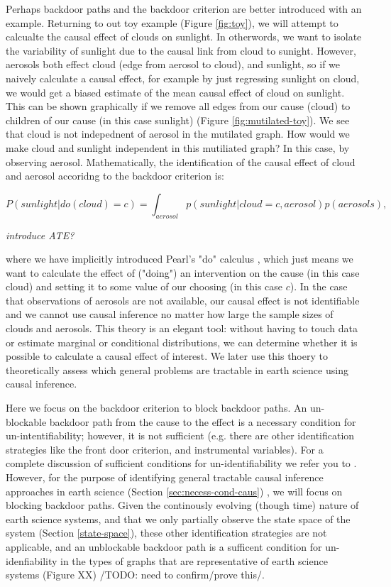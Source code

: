 \documentclass[12pt]{article}
\begin{document}
Perhaps backdoor paths and the backdoor criterion are better
introduced with an example. Returning to out toy example (Figure
\ref{fig:toy}), we will attempt to calcualte the causal effect of
clouds on sunlight. In otherwords, we want to isolate the variability
of sunlight due to the causal link from cloud to sunight. However,
aerosols both effect cloud (edge from aerosol to cloud), and sunlight,
so if we naively calculate a causal effect, for example by just
regressing sunlight on cloud, we would get a biased estimate of the
mean causal effect of cloud on sunlight. This can be shown graphically
if we remove all edges from our cause (cloud) to children of our cause
(in this case sunlight) (Figure \ref{fig:mutilated-toy}). We see that
cloud is not indepednent of aerosol in the mutilated graph. How would
we make cloud and sunlight independent in this mutiliated graph?  In
this case, by observing aerosol. Mathematically, the identification of
the causal effect of cloud and aerosol accoridng to the backdoor
criterion is:

\begin{equation}
  P(sunlight | do(cloud) = c) = \int_{aerosol} p(sunlight| cloud = c,
  aerosol) p(aerosols),
\end{equation}

\emph{introduce ATE?}

where we have implicitly introduced Pearl's "do" calculus
\citep{pearl2009}, which just means we want to calculate the effect of
("doing") an intervention on the cause (in this case cloud) and
setting it to some value of our choosing (in this case \(c\)). In the
case that observations of aerosols are not available, our causal
effect is not identifiable and we cannot use causal inference no
matter how large the sample sizes of clouds and aerosols. This theory
is an elegant tool: without having to touch data or estimate marginal
or conditional distributions, we can determine whether it is possible
to calculate a causal effect of interest. We later use this thoery to
theoretically assess which general problems are tractable in earth
science using causal inference.

Here we focus on the backdoor criterion to block backdoor paths. An
un-blockable backdoor path from the cause to the effect is a necessary
condition for un-intentifiability; however, it is not sufficient
(e.g. there are other identification strategies like the front door
criterion, and instrumental variables). For a complete discussion of
sufficient conditions for un-identifiability we refer you to
\citet{shpitser2006}. However, for the purpose of identifying general
tractable causal inference approaches in earth science (Section
\ref{sec:necess-cond-caus}) , we will focus on blocking backdoor
paths. Given the continously evolving (though time) nature of earth
science systems, and that we only partially observe the state space of
the system (Section \ref{state-space}), these other identification
strategies are not applicable, and an unblockable backdoor path is a
sufficent condition for un-idenfiability in the types of graphs that
are representative of earth science systems (Figure XX) /TODO: need to
confirm/prove this/.
\end{document}
